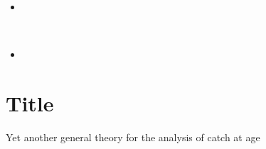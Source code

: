 \documentclass[11pt]{article}
\begin{document}
\begin{itemize}
\item
\end{itemize}

\\

\begin{itemize}
\item
\end{itemize}


\section{Title}
Yet another general theory for the analysis of catch at age
\end{document}
